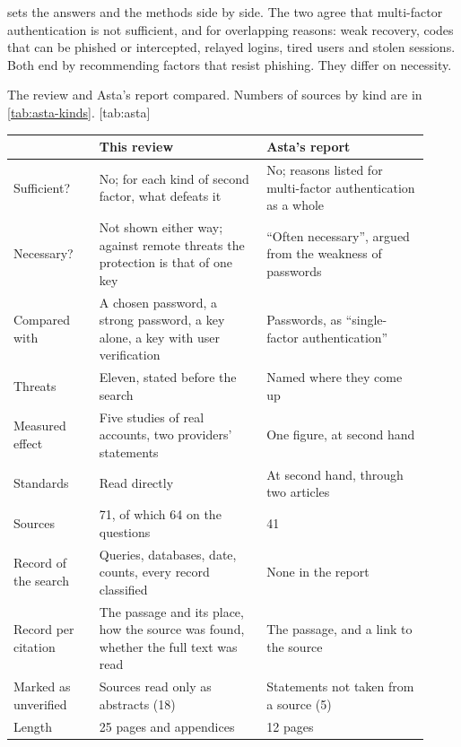 \begin{refsection}
 sets the answers and the methods side by side.
The two agree that multi-factor authentication is not sufficient, and
for overlapping reasons: weak recovery, codes that can be phished or
intercepted, relayed logins, tired users and stolen sessions.
Both end by recommending factors that resist phishing.
They differ on necessity.
\begin{table}
  \begin{sidecaption}{%
    The review and Asta's report compared.
    Numbers of sources by kind are in \cref{tab:asta-kinds}.
  }[tab:asta]
    \footnotesize
    \begin{tabular}{@{}L{0.19\linewidth}L{0.37\linewidth}L{0.36\linewidth}@{}}
      \toprule
      & This review & Asta's report \\
      \midrule
      Sufficient?
        & No; for each kind of second factor, what defeats it
        & No; reasons listed for multi-factor authentication as a
          whole \\
      Necessary?
        & Not shown either way; against remote threats the protection
          is that of one key
        & \enquote{Often necessary}, argued from the weakness of
          passwords \\
      Compared with
        & A chosen password, a strong password, a key alone, a key
          with user verification
        & Passwords, as \enquote{single-factor authentication} \\
      Threats
        & Eleven, stated before the search
        & Named where they come up \\
      Measured effect
        & Five studies of real accounts, two providers' statements
        & One figure, at second hand \\
      Standards
        & Read directly
        & At second hand, through two articles \\
      Sources
        & 71, of which 64 on the questions
        & 41 \\
      Record of the search
        & Queries, databases, date, counts, every record classified
        & None in the report \\
      Record per citation
        & The passage and its place, how the source was found, whether
          the full text was read
        & The passage, and a link to the source \\
      Marked as unverified
        & Sources read only as abstracts (18)
        & Statements not taken from a source (5) \\
      Length
        & 25 pages and appendices
        & 12 pages \\
      \bottomrule
    \end{tabular}
  \end{sidecaption}
\end{table}


\end{refsection}
